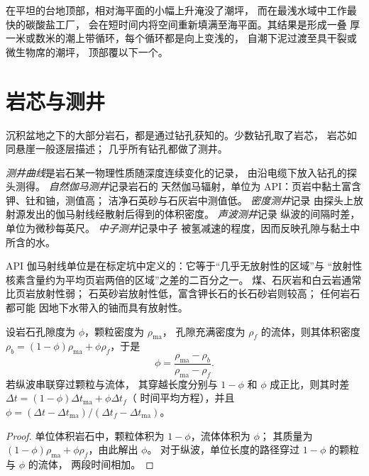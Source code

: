 在平坦的台地顶部，相对海平面的小幅上升淹没了潮坪，
而在最浅水域中工作最快的碳酸盐工厂，
会在短时间内将空间重新填满至海平面。其结果是形成一叠
厚一米或数米的潮上带循环，每个循环都是向上变浅的，
自潮下泥过渡至具干裂或微生物席的潮坪，
顶部覆以下一个。

\section{岩芯与测井}\label{sec:b3:facies-models:logs}

沉积盆地之下的大部分岩石，都是通过钻孔获知的。少数钻孔取了岩芯，
岩芯如同悬崖一般逐层描述；
几乎所有钻孔都做了测井。

\begin{definition}[测井曲线]\label{def:b3:facies-models:wireline}
\emph{测井曲线}是岩石某一物理性质随深度连续变化的记录，
由沿电缆下放入钻孔的探头测得。
\emph{自然伽马测井}记录岩石的
天然伽马辐射，单位为 API：页岩中黏土富含钾、钍和铀，测值高；
洁净石英砂与石灰岩中测值低。
\emph{密度测井}记录
由探头上放射源发出的伽马射线经散射后得到的体积密度。
\emph{声波测井}记录
纵波的间隔时差，单位为微秒每英尺。
\emph{中子测井}记录中子
被氢减速的程度，因而反映孔隙与黏土中所含的水。
\end{definition}

API 伽马射线单位是在标定坑中定义的：它等于“几乎无放射性的区域”与
“放射性核素含量约为平均页岩两倍的区域”之差的二百分之一。
煤、石灰岩和白云岩通常比页岩放射性弱；
石英砂岩放射性低，富含钾长石的长石砂岩则较高；
任何岩石都可能
因地下水带入的铀而具有放射性。

\begin{proposition}[由密度与时差求孔隙度]\label{prop:b3:facies-models:porosity}
设岩石孔隙度为 $\phi$，颗粒密度为 $\rho_{\mathrm{ma}}$，
孔隙充满密度为 $\rho_f$ 的流体，则其体积密度
$\rho_b = (1 - \phi)\rho_{\mathrm{ma}} + \phi\rho_f$，于是
\[
\phi = \frac{\rho_{\mathrm{ma}} - \rho_b}{\rho_{\mathrm{ma}} - \rho_f}.
\]
若纵波串联穿过颗粒与流体，
其穿越长度分别与 $1 - \phi$ 和 $\phi$ 成正比，则其时差
$\Delta t = (1 - \phi)\Delta t_{\mathrm{ma}} + \phi\Delta t_f$（
时间平均方程），并且 $\phi = (\Delta t - \Delta
t_{\mathrm{ma}})/(\Delta t_f - \Delta t_{\mathrm{ma}})$。
\end{proposition}

\begin{proof}
单位体积岩石中，颗粒体积为 $1 - \phi$，流体体积为 $\phi$；
其质量为 $(1 - \phi)\rho_{\mathrm{ma}} + \phi\rho_f$，由此解出 $\phi$。
对于纵波，单位长度的路径穿过 $1 - \phi$ 的颗粒与 $\phi$ 的流体，
两段时间相加。
\end{proof}

